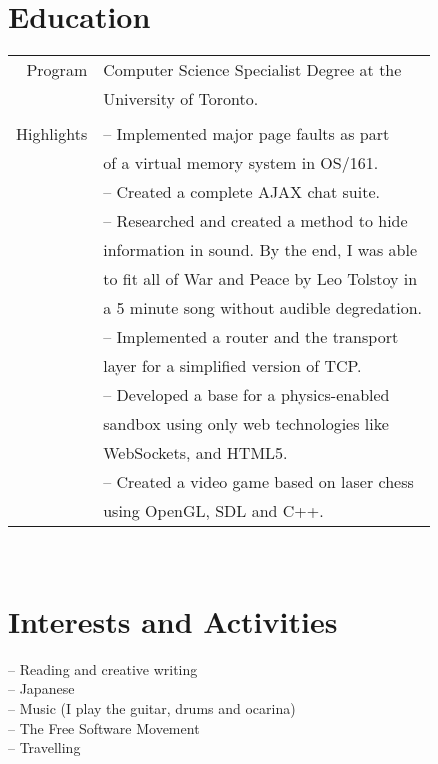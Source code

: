 \documentclass[10pt]{article}
\begin{document}
\begin{minipage}[t]{0.44\textwidth}
\section{Education}
    \begin{tabular}{rl}
    Program     &   Computer Science Specialist Degree at the\\
                &   University of Toronto.\\
                \\
    Highlights  &   -- Implemented major page faults as part\\
                &   of a virtual memory system in OS/161.\\
                &   -- Created a complete AJAX chat suite.\\
                &   -- Researched and created a method to hide\\
                &   information in sound. By the end, I was able\\
                &	to fit all of War and Peace by Leo Tolstoy in\\
                &   a 5 minute song without audible degredation.\\
                &   -- Implemented a router and the transport\\ 
                &   layer for a simplified version of TCP.\\
                &   -- Developed a base for a physics-enabled\\ 
                &   sandbox using only web technologies like\\
                &   WebSockets, and HTML5.\\
				&	-- Created a video game based on laser chess\\
				& 	using OpenGL, SDL and C++.\\
    \end{tabular}\\[10pt]

\section{Interests and Activities}
	-- Reading and creative writing\\
	-- Japanese\\
	-- Music (I play the guitar, drums and ocarina)\\
	-- The Free Software Movement\\
    -- Travelling
	
\end{minipage}
\end{document}
